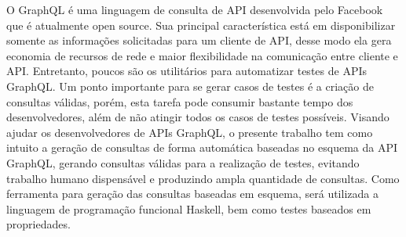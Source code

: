 \begin{resumo}
O GraphQL é uma linguagem de consulta de API desenvolvida pelo Facebook que é atualmente open source. Sua principal característica está em disponibilizar somente as informações solicitadas para um cliente de API, desse modo ela gera economia de recursos de rede e maior flexibilidade na comunicação entre cliente e API. Entretanto, poucos são os utilitários para automatizar testes de APIs GraphQL. Um ponto importante para se gerar casos de testes é a criação de consultas válidas, porém, esta tarefa pode consumir bastante tempo dos desenvolvedores, além de não atingir todos os casos de testes possíveis. Visando ajudar os desenvolvedores de APIs GraphQL, o presente trabalho tem como intuito a geração de consultas de forma automática baseadas no esquema da API GraphQL, gerando consultas válidas para a realização de testes, evitando trabalho humano dispensável e produzindo ampla quantidade de consultas. Como ferramenta para geração das consultas baseadas em esquema, será utilizada a linguagem de programação funcional Haskell, bem como testes baseados em propriedades.
\end{resumo}
